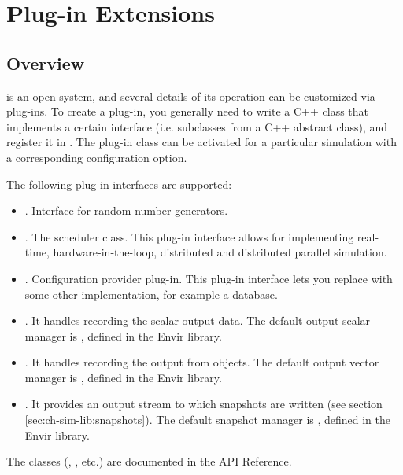 \chapter{Plug-in Extensions}
\label{cha:plugin-exts}

\section{Overview}

{\opp} is an open system, and several details of its operation
can be customized via plug-ins. To create a plug-in, you generally
need to write a C++ class that implements a certain interface
(i.e. subclasses from a C++ abstract class), and register it in {\opp}.
The plug-in class can be activated for a particular simulation
with a corresponding configuration option.

The following plug-in interfaces are supported:

\begin{itemize}
   \item{. Interface for random number generators.}
   \item{. The scheduler class. This plug-in interface
     allows for implementing real-time, hardware-in-the-loop, distributed
     and distributed parallel simulation.}
   \item{. Configuration provider plug-in.
     This plug-in interface lets you replace 
     with some other implementation, for example a database.}
   \item{. It handles recording the scalar output data.
     The default output scalar manager is ,
     defined in the Envir library.}
   \item{. It handles recording the output
     from  objects. The default output vector manager is
     , defined in the Envir library.}
   \item{. It provides an output stream to which
     snapshots are written (see section \ref{sec:ch-sim-lib:snapshots}).
     The default snapshot manager is ,
     defined in the Envir library.}
\end{itemize}

The classes (, , etc.) are documented in
the API Reference.

